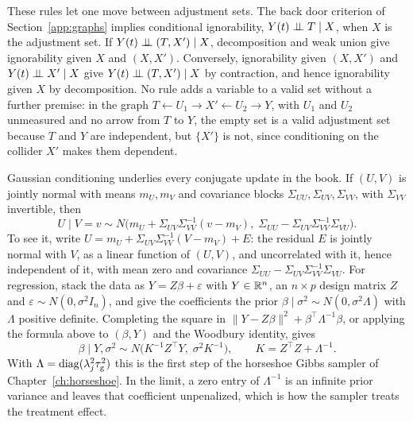 These rules let one move between adjustment sets. The back door criterion of Section~\ref{app:graphs} implies conditional ignorability, $Y(t) \perp\!\!\!\perp T \mid X$, when $X$ is the adjustment set. If $Y(t) \perp\!\!\!\perp (T, X') \mid X$, decomposition and weak union give ignorability given $X$ and $(X, X')$. Conversely, ignorability given $(X, X')$ and $Y(t) \perp\!\!\!\perp X' \mid X$ give $Y(t) \perp\!\!\!\perp (T, X') \mid X$ by contraction, and hence ignorability given $X$ by decomposition. No rule adds a variable to a valid set without a further premise: in the graph $T \leftarrow U_1 \to X' \leftarrow U_2 \to Y$, with $U_1$ and $U_2$ unmeasured and no arrow from $T$ to $Y$, the empty set is a valid adjustment set because $T$ and $Y$ are independent, but $\{X'\}$ is not, since conditioning on the collider $X'$ makes them dependent.

Gaussian conditioning underlies every conjugate update in the book. If $(U, V)$ is jointly normal with means $m_U, m_V$ and covariance blocks $\Sigma_{UU}, \Sigma_{UV}, \Sigma_{VV}$, with $\Sigma_{VV}$ invertible, then
\[
U \mid V = v \sim N\bigl(m_U + \Sigma_{UV}\Sigma_{VV}^{-1}(v - m_V),\; \Sigma_{UU} - \Sigma_{UV}\Sigma_{VV}^{-1}\Sigma_{VU}\bigr).
\]
To see it, write $U = m_U + \Sigma_{UV}\Sigma_{VV}^{-1}(V - m_V) + E$: the residual $E$ is jointly normal with $V$, as a linear function of $(U, V)$, and uncorrelated with it, hence independent of it, with mean zero and covariance $\Sigma_{UU} - \Sigma_{UV}\Sigma_{VV}^{-1}\Sigma_{VU}$. For regression, stack the data as $Y = Z\beta + \varepsilon$ with $Y \in \mathbb{R}^n$, an $n \times p$ design matrix $Z$ and $\varepsilon \sim N(0, \sigma^2 I_n)$, and give the coefficients the prior $\beta \mid \sigma^2 \sim N(0, \sigma^2\Lambda)$ with $\Lambda$ positive definite. Completing the square in $\|Y - Z\beta\|^2 + \beta^\top\Lambda^{-1}\beta$, or applying the formula above to $(\beta, Y)$ and the Woodbury identity, gives
\[
\beta \mid Y, \sigma^2 \sim N\bigl(K^{-1}Z^\top Y,\; \sigma^2 K^{-1}\bigr), \qquad K = Z^\top Z + \Lambda^{-1}.
\]
With $\Lambda = \mathrm{diag}(\lambda_j^2\tau_{\mathrm{g}}^2)$ this is the first step of the horseshoe Gibbs sampler of Chapter~\ref{ch:horseshoe}. In the limit, a zero entry of $\Lambda^{-1}$ is an infinite prior variance and leaves that coefficient unpenalized, which is how the sampler treats the treatment effect.

